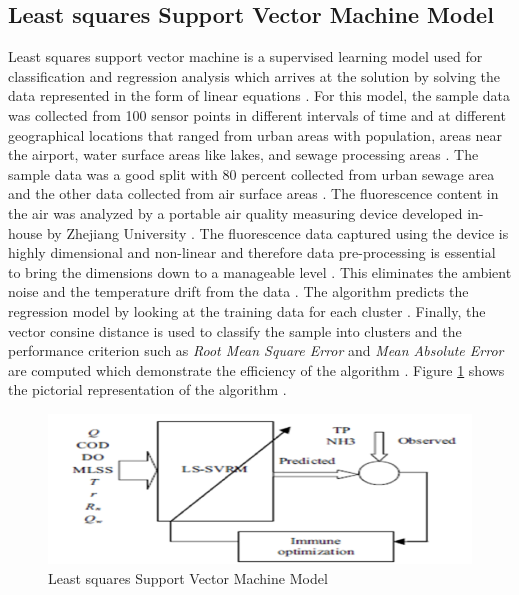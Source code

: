 \documentclass[sigconf]{acmart}
\begin{document}
\subsection{Least squares Support Vector Machine Model}
Least squares support vector machine is a supervised learning model used for classification and regression analysis which arrives at the solution by solving the data represented in the form of linear equations \cite{gagan2017}. For this model, the sample data was collected from 100 sensor points in different intervals of time and at different geographical locations that ranged from urban areas with population, areas near the airport, water surface areas like lakes, and sewage processing areas \cite{gagan2017}. The sample data was a good split with 80 percent collected from urban sewage area and the other data collected from air surface areas \cite{gagan2017}. The fluorescence content in the air was analyzed by a portable air quality measuring device developed in-house by Zhejiang University \cite{gagan2017}. The fluorescence data captured using the device is highly dimensional and non-linear and therefore data pre-processing is essential to bring the dimensions down to a manageable level \cite{gagan2017}. This eliminates the ambient noise and the temperature drift from the data \cite{gagan2017}. The algorithm predicts the regression model by looking at the training data for each cluster \cite{gagan2017}. Finally, the vector consine distance is used to classify the sample into clusters and the performance criterion such as {\em Root Mean Square Error}  and {\em Mean Absolute Error} are computed which demonstrate the efficiency of the algorithm \cite{gagan2017}. Figure \ref{fig:Fig8} shows the pictorial representation of the algorithm \cite{gagan2017}.

\begin{figure}
\includegraphics[width=1.0\textwidth]{images/fig8.png}
\caption{Least squares Support Vector Machine Model \cite{gagan2017}}
\label{fig:Fig8}
\end{figure}
\end{document}
